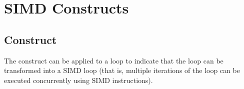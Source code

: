 %
%
%
%
%
%
%
%
%
%
%
%
%


\section{SIMD Constructs}
\label{sec:SIMD Constructs}
\subsection{ Construct}
\label{subsec:simd Construct}
\summary
The  construct can be applied to a loop to indicate that the loop can be transformed
into a SIMD loop (that is, multiple iterations of the loop can be executed concurrently
using SIMD instructions).

